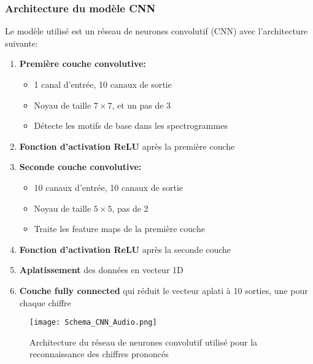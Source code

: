 \documentclass{article}
\begin{document}
\subsubsection{Architecture du modèle CNN}
\label{subsubsec:architecture}

Le modèle utilisé est un réseau de neurones convolutif (CNN) avec l'architecture suivante:

\begin{enumerate}
    \item \textbf{Première couche convolutive:}
    \begin{itemize}
        \item 1 canal d'entrée, 10 canaux de sortie
        \item Noyau de taille $7 \times 7$, et un pas de 3
        \item Détecte les motifs de base dans les spectrogrammes
    \end{itemize}
    
    \item \textbf{Fonction d'activation ReLU} après la première couche
    
    \item \textbf{Seconde couche convolutive:}
    \begin{itemize}
        \item 10 canaux d'entrée, 10 canaux de sortie
        \item Noyau de taille $5 \times 5$, pas de 2
        \item Traite les feature maps de la première couche
    \end{itemize}
    
    \item \textbf{Fonction d'activation ReLU} après la seconde couche
    
    \item \textbf{Aplatissement} des données en vecteur 1D
    
    \item \textbf{Couche fully connected} qui réduit le vecteur aplati à 10 sorties, une pour chaque chiffre
\end{enumerate}

\begin{figure}[H]
    \centering
    \texttt{[image: Schema\_CNN\_Audio.png]}
    \caption{Architecture du réseau de neurones convolutif utilisé pour la reconnaissance des chiffres prononcés}
    \label{fig:cnn_archi}
\end{figure}
\end{document}
